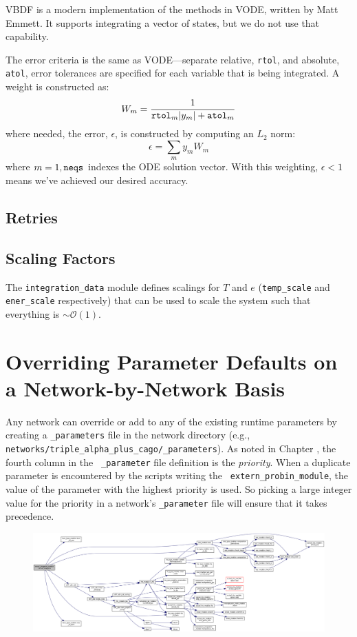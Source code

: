 VBDF is a modern implementation of the methods in VODE, written by
Matt Emmett.  It supports integrating a vector of states, but we do
not use that capability.  

The error criteria is the same as VODE---separate relative, {\tt rtol},
and absolute, {\tt atol}, error tolerances are specified for each
variable that is being integrated.  A weight is constructed as:
\begin{equation}
W_m = \frac{1}{{\tt rtol}_m |y_m| + {\tt atol}_m}
\end{equation}
where needed, the error, $\epsilon$, is constructed by computing an $L_2$
norm:
\begin{equation}
\epsilon = \sum_m y_m W_m
\end{equation}
where $m = 1, {\tt neqs}$ indexes the ODE solution vector.  With this
weighting, $\epsilon < 1$ means we've achieved our desired accuracy.


\subsection{Retries}


\subsection{Scaling Factors}

The {\tt integration\_data} module defines scalings for $T$ and $e$
({\tt temp\_scale} and {\tt ener\_scale} respectively) that can be
used to scale the system such that everything is $\sim
\mathcal{O}(1)$.  


\section{Overriding Parameter Defaults on a Network-by-Network Basis}

Any network can override or add to any of the existing runtime
parameters by creating a {\tt \_parameters} file in the network
directory (e.g., {\tt
  networks/triple\_alpha\_plus\_cago/\_parameters}).  As noted in
Chapter \label{chapter:parameters}, the fourth column in the {\tt
  \_parameter} file definition is the {\em priority}.  When a
duplicate parameter is encountered by the scripts writing the {\tt
  extern\_probin\_module}, the value of the parameter with the highest
priority is used.  So picking a large integer value for the priority
in a network's {\tt \_parameter} file will ensure that it takes
precedence.


\begin{figure}
\centering
\includegraphics[width=\linewidth]{doxygen_network}
\end{figure}
